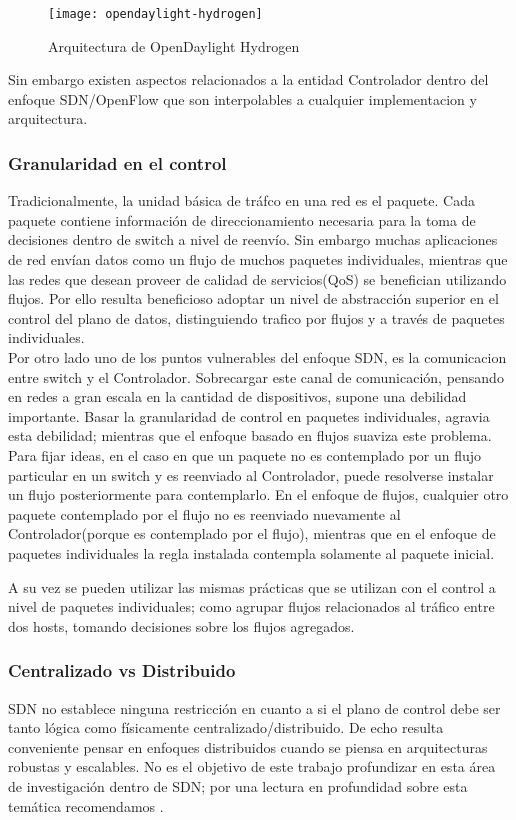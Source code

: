 \newpage
\begin{figure}[htbp!] 
\centering    
\texttt{[image: opendaylight-hydrogen]}
\caption[OF 1.3.3 Matching Fields]{Arquitectura de OpenDaylight Hydrogen}
\label{fig:OpenDayLightHydrogen}
\end{figure}

Sin embargo existen aspectos relacionados a la entidad Controlador dentro del enfoque SDN/OpenFlow que son interpolables a cualquier implementacion y arquitectura.
  
\subsubsection{Granularidad en el control}
Tradicionalmente, la unidad básica de tráfco en una red es el paquete. Cada paquete contiene información de direccionamiento necesaria para la toma de decisiones dentro de switch a nivel de reenvío. Sin embargo muchas aplicaciones de red envían datos como un flujo de muchos paquetes individuales, mientras que las redes que desean proveer de calidad de servicios(QoS) se benefician utilizando flujos. Por ello resulta beneficioso adoptar un nivel de abstracción superior en el control del plano de datos, distinguiendo trafico por flujos y a través de paquetes individuales.\\
 
Por otro lado uno de los puntos vulnerables del enfoque SDN, es la comunicacion entre switch y el Controlador. Sobrecargar este canal de comunicación, pensando en redes a gran escala en la cantidad de dispositivos, supone una debilidad importante. Basar la granularidad de control en paquetes individuales, agravia esta debilidad; mientras que el enfoque basado en flujos suaviza este problema. Para fijar ideas, en el caso en que un paquete no es contemplado por un flujo particular en un switch y es reenviado al Controlador, puede resolverse instalar un flujo posteriormente para contemplarlo. En el enfoque de flujos, cualquier otro paquete contemplado por el flujo no es reenviado nuevamente al Controlador(porque es contemplado por el flujo), mientras que en el enfoque de paquetes individuales la regla instalada contempla solamente al paquete inicial.

A su vez se pueden utilizar las mismas prácticas que se utilizan con el control a nivel
de paquetes individuales; como agrupar flujos relacionados al tráfico entre dos hosts, tomando
decisiones sobre los flujos agregados. 

\subsubsection{Centralizado vs Distribuido}
SDN no establece ninguna restricción en cuanto a si el plano de control debe ser tanto lógica como físicamente centralizado/distribuido. De echo resulta conveniente pensar en enfoques distribuidos cuando se piensa en arquitecturas robustas y escalables. No es el objetivo de este trabajo profundizar en esta área de investigación dentro de SDN; por una lectura en profundidad sobre esta temática recomendamos \cite{heller2012controller}\cite{levin2012logically}. 

